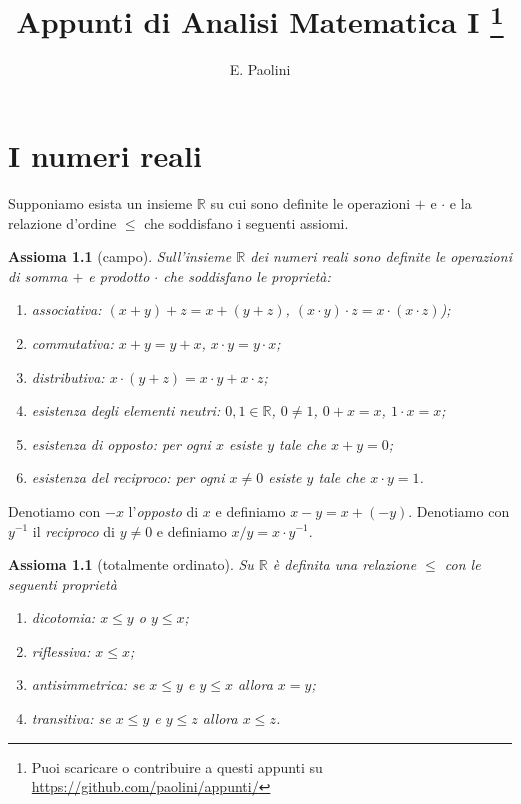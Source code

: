 \documentclass[italian,a4paper,oneside,headinclude]{scrbook}
\title{Appunti di Analisi Matematica I%
\thanks{%
Puoi scaricare o contribuire a questi appunti su
\url{https://github.com/paolini/appunti/}}}
\author{E. Paolini}
\newcommand{\myemph}[1]{\emph{#1}\marginpar{#1}}
\newcommand{\RR}{\mathbb R}
\newtheorem{axiom}[theorem]{Assioma}
\begin{document}
\maketitle


\chapter{I numeri reali}

Supponiamo esista un insieme $\RR$ su cui sono definite le operazioni $+$ e $\cdot$
e la relazione d'ordine $\le$ che soddisfano i seguenti assiomi.
\marginpar{$\RR$}

\begin{axiom}[campo]\label{axiom_field}
Sull'insieme $\RR$ dei numeri reali sono definite le operazioni di somma $+$ e
prodotto $\cdot$ che soddisfano le proprietà:
\begin{enumerate}
\item associativa: $(x+y)+z = x + (y+z)$, $(x\cdot y)\cdot z = x \cdot (x \cdot z)$);
\item commutativa: $x+y=y+x$, $x\cdot y = y \cdot x$;
\item distributiva: $x\cdot (y+z) = x\cdot y + x \cdot z$;
\item esistenza degli elementi neutri: $0,1\in \RR$,
$0\neq 1$, $0+x = x$, $1\cdot x = x$;
\item esistenza di opposto: per ogni $x$ esiste $y$ tale che $x+y = 0$;
\item esistenza del reciproco: per ogni $x\neq 0$ esiste $y$ tale che $x \cdot y = 1$.
\end{enumerate}
\end{axiom}

Denotiamo con $-x$ l'\myemph{opposto} di $x$ e definiamo $x-y = x+(-y)$.
Denotiamo con $y^{-1}$ il \myemph{reciproco} di $y\neq 0$ e
definiamo $x / y = x\cdot y^{-1}$.

\begin{axiom}[totalmente ordinato]\label{axiom_order}
\marginpar{$\le$}
Su $\RR$ è definita una relazione $\le$ con le seguenti proprietà
\begin{enumerate}
\item dicotomia: $x \le y$ o $y \le x$;
\item riflessiva: $x \le x$;
\item antisimmetrica: se $ x\le y$ e $y \le x$ allora $x=y$;
\item transitiva: se $x\le y $ e $ y \le z$ allora $x\le z$.
\end{enumerate}
\end{axiom}
\end{document}
